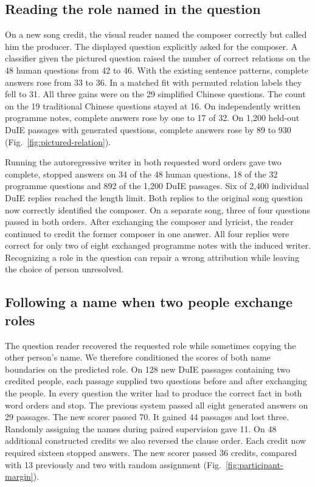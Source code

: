 \documentclass[12pt,a4paper]{article}
\providecommand{\DIFadd}[1]{{\protect\color{blue} \sf #1}} %
\begin{document}
\subsection*{\DIFadd{Reading the role named in the question}}
\DIFadd{On a new song credit, the visual reader named the composer correctly but called him the producer. The displayed question explicitly asked for the composer. A classifier given the pictured question raised the number of correct relations on the 48 human questions from 42 to 46. With the existing sentence patterns, complete answers rose from 33 to 36. In a matched fit with permuted relation labels they fell to 31. All three gains were on the 29 simplified Chinese questions. The count on the 19 traditional Chinese questions stayed at 16. On independently written programme notes, complete answers rose by one to 17 of 32. On 1,200 held-out DuIE passages with generated questions, complete answers rose by 89 to 930 (Fig.~\ref{fig:pictured-relation}).
}

\DIFadd{Running the autoregressive writer in both requested word orders gave two complete, stopped answers on 34 of the 48 human questions, 18 of the 32 programme questions and 892 of the 1,200 DuIE passages. Six of 2,400 individual DuIE replies reached the length limit. Both replies to the original song question now correctly identified the composer. On a separate song, three of four questions passed in both orders. After exchanging the composer and lyricist, the reader continued to credit the former composer in one answer. All four replies were correct for only two of eight exchanged programme notes with the induced writer. Recognizing a role in the question can repair a wrong attribution while leaving the choice of person unresolved.
}

\subsection*{\DIFadd{Following a name when two people exchange roles}}
\DIFadd{The question reader recovered the requested role while sometimes copying the other person's name. We therefore conditioned the scores of both name boundaries on the predicted role. On 128 new DuIE passages containing two credited people, each passage supplied two questions before and after exchanging the people. In every question the writer had to produce the correct fact in both word orders and stop. The previous system passed all eight generated answers on 29 passages. The new scorer passed 70. It gained 44 passages and lost three. Randomly assigning the names during paired supervision gave 11. On 48 additional constructed credits we also reversed the clause order. Each credit now required sixteen stopped answers. The new scorer passed 36 credits, compared with 13 previously and two with random assignment (Fig.~\ref{fig:participant-margin}).
}
\end{document}
